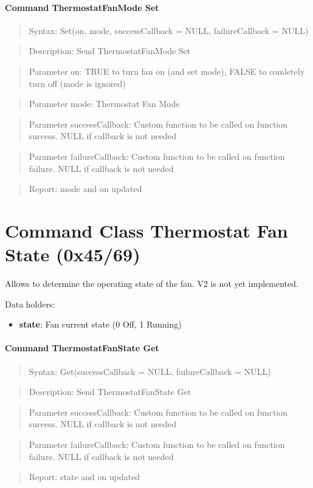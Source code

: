\paragraph{Command ThermostatFanMode Set}
\begin{quote}Syntax: Set(on, mode, successCallback = NULL, failureCallback = NULL)\end{quote}
\begin{quote}Description: Send ThermostatFanMode Set\end{quote}
\begin{quote}Parameter on: TRUE to turn fan on (and set mode), FALSE to comletely turn off (mode is ignored)\end{quote}
\begin{quote}Parameter mode: Thermostat Fan Mode\end{quote}
\begin{quote}Parameter successCallback: Custom function to be called on function success. NULL if callback is not needed\end{quote}
\begin{quote}Parameter failureCallback: Custom function to be called on function failure. NULL if callback is not needed\end{quote}
\begin{quote}Report: mode and on updated\end{quote}


\section{Command Class Thermostat Fan State (0x45/69)}

Allows to determine the operating state of the fan. V2 is not yet implemented.
\newline

\noindent
Data holders:

\begin{itemize}
\item \textbf{state}: Fan current state (0 Off, 1 Running)
\end{itemize}

\paragraph{Command ThermostatFanState Get}
\begin{quote}Syntax: Get(successCallback = NULL, failureCallback = NULL)\end{quote}
\begin{quote}Description: Send ThermostatFanState Get\end{quote}
\begin{quote}Parameter successCallback: Custom function to be called on function success. NULL if callback is not needed\end{quote}
\begin{quote}Parameter failureCallback: Custom function to be called on function failure. NULL if callback is not needed\end{quote}
\begin{quote}Report: state and on updated\end{quote}


